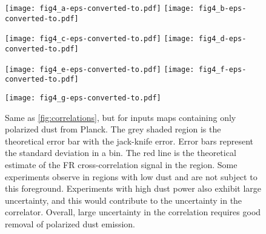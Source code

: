 \documentclass[usenatbib,hidelinks]{mnras}
\begin{document}
\begin{figure*}
\centering
\texttt{[image: fig4\_a-eps-converted-to.pdf]}
\texttt{[image: fig4\_b-eps-converted-to.pdf]}

\texttt{[image: fig4\_c-eps-converted-to.pdf]}
\texttt{[image: fig4\_d-eps-converted-to.pdf]}

\texttt{[image: fig4\_e-eps-converted-to.pdf]}
\texttt{[image: fig4\_f-eps-converted-to.pdf]}

\texttt{[image: fig4\_g-eps-converted-to.pdf]}
\caption{Same as \autoref{fig:correlations}, but for inputs maps containing only polarized dust from Planck. The grey shaded region is the theoretical error bar with the jack-knife error. Error bars represent the standard deviation in a bin. The red line is the theoretical estimate of the FR cross-correlation signal in the region. Some experiments observe in regions with low dust and are not subject to this foreground. Experiments with high dust power also exhibit large uncertainty, and this would contribute to the uncertainty in the correlator. Overall, large uncertainty in the correlation requires good removal of polarized dust emission. \label{fig:frxfore_dust}}
\end{figure*}
 
\end{document}
